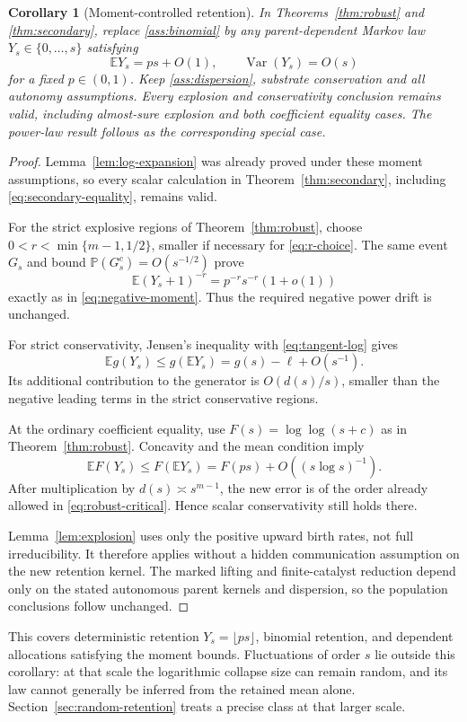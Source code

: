 \documentclass[11pt,a4paper]{article}
\newtheorem{corollary}[theorem]{Corollary}
\theoremstyle{remark}\newtheorem{remark}[theorem]{Remark}
\DeclareMathOperator{\Var}{Var}
\newcommand{\E}{\mathbb E}
\newcommand{\Prob}{\mathbb P}
\begin{document}
\begin{corollary}[Moment-controlled retention]\label{cor:moments}
In Theorems~\ref{thm:robust} and \ref{thm:secondary}, replace \ref{ass:binomial} by any parent-dependent Markov law $Y_s\in\{0,\ldots,s\}$ satisfying
\[
\E Y_s=ps+O(1),\qquad \Var(Y_s)=O(s)
\]
for a fixed $p\in(0,1)$. Keep \ref{ass:dispersion}, substrate conservation and all autonomy assumptions. Every explosion and conservativity conclusion remains valid, including almost-sure explosion and both coefficient equality cases. The power-law result follows as the corresponding special case.
\end{corollary}
\begin{proof}
Lemma~\ref{lem:log-expansion} was already proved under these moment assumptions, so every scalar calculation in Theorem~\ref{thm:secondary}, including \eqref{eq:secondary-equality}, remains valid.

For the strict explosive regions of Theorem~\ref{thm:robust}, choose
$0<r<\min\{m-1,1/2\}$, smaller if necessary for \eqref{eq:r-choice}. The same event $G_s$ and bound $\Prob(G_s^c)=O(s^{-1/2})$ prove
\[
\E(Y_s+1)^{-r}=p^{-r}s^{-r}(1+o(1))
\]
exactly as in \eqref{eq:negative-moment}. Thus the required negative power drift is unchanged.

For strict conservativity, Jensen's inequality with \eqref{eq:tangent-log} gives
\[
\E g(Y_s)\le g(\E Y_s)
           =g(s)-\ell+O(s^{-1}).
\]
Its additional contribution to the generator is $O(d(s)/s)$, smaller than the negative leading terms in the strict conservative regions.

At the ordinary coefficient equality, use $F(s)=\log\log(s+c)$ as in Theorem~\ref{thm:robust}. Concavity and the mean condition imply
\[
\E F(Y_s)\le F(\E Y_s)=F(ps)+O((s\log s)^{-1}).
\]
After multiplication by $d(s)\asymp s^{m-1}$, the new error is of the order already allowed in \eqref{eq:robust-critical}. Hence scalar conservativity still holds there.

Lemma~\ref{lem:explosion} uses only the positive upward birth rates, not full irreducibility. It therefore applies without a hidden communication assumption on the new retention kernel. The marked lifting and finite-catalyst reduction depend only on the stated autonomous parent kernels and dispersion, so the population conclusions follow unchanged.
\end{proof}

This covers deterministic retention $Y_s=\lfloor ps\rfloor$, binomial retention, and dependent allocations satisfying the moment bounds. Fluctuations of order $s$ lie outside this corollary: at that scale the logarithmic collapse size can remain random, and its law cannot generally be inferred from the retained mean alone. Section~\ref{sec:random-retention} treats a precise class at that larger scale.
\end{document}
